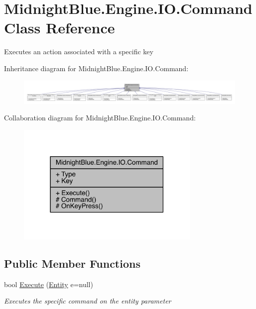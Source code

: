 \hypertarget{class_midnight_blue_1_1_engine_1_1_i_o_1_1_command}{}\section{Midnight\+Blue.\+Engine.\+I\+O.\+Command Class Reference}
\label{class_midnight_blue_1_1_engine_1_1_i_o_1_1_command}


Executes an action associated with a specific key  




Inheritance diagram for Midnight\+Blue.\+Engine.\+I\+O.\+Command\+:
\nopagebreak
\begin{figure}[H]
\begin{center}
\leavevmode
\includegraphics[width=350pt]{class_midnight_blue_1_1_engine_1_1_i_o_1_1_command__inherit__graph}
\end{center}
\end{figure}


Collaboration diagram for Midnight\+Blue.\+Engine.\+I\+O.\+Command\+:
\nopagebreak
\begin{figure}[H]
\begin{center}
\leavevmode
\includegraphics[width=250pt]{class_midnight_blue_1_1_engine_1_1_i_o_1_1_command__coll__graph}
\end{center}
\end{figure}
\subsection*{Public Member Functions}
\begin{DoxyCompactItemize}
\item 
bool \hyperlink{class_midnight_blue_1_1_engine_1_1_i_o_1_1_command_ae806e7b2cab794940726b3329b776588}{Execute} (\hyperlink{class_midnight_blue_1_1_engine_1_1_entity_component_1_1_entity}{Entity} e=null)
\begin{DoxyCompactList}\small\item\em Executes the specific command on the entity parameter \end{DoxyCompactList}\end{DoxyCompactItemize}
